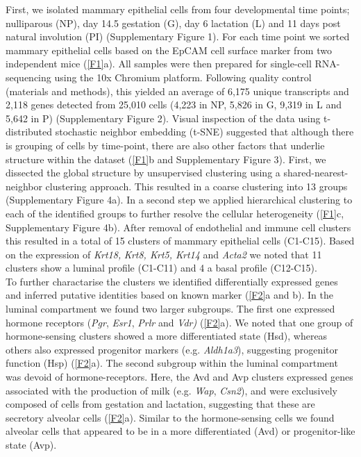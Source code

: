 \documentclass[titlepage, 12pt, oneside]{amsart}
\begin{document}
First, we isolated mammary epithelial cells from four developmental time points; nulliparous (NP), day 14.5 gestation (G), day 6 lactation (L) and 11 days post natural involution (PI) (Supplementary Figure 1).
For each time point we sorted mammary epithelial cells based on the EpCAM cell surface marker from two independent mice (\autoref{F1}a).
All samples were then prepared for single-cell RNA-sequencing using the 10x Chromium platform\autocite{Zheng2017}.
Following quality control (materials and methods), this yielded an average of 6,175 unique transcripts and 2,118 genes detected from 25,010 cells (4,223 in NP, 5,826 in G, 9,319 in L and 5,642 in P) (Supplementary Figure 2).
Visual inspection of the data using t-distributed stochastic neighbor embedding (t-SNE) suggested that although there is grouping of cells by time-point, there are also other factors that underlie structure within the dataset (\autoref{F1}b and Supplementary Figure 3).
First, we dissected the global structure by unsupervised clustering using a shared-nearest-neighbor clustering approach.
This resulted in a coarse clustering into 13 groups (Supplementary Figure 4a).
In a second step we applied hierarchical clustering to each of the identified groups to further resolve the cellular heterogeneity (\autoref{F1}c, Supplementary Figure 4b).
After removal of endothelial and immune cell clusters this resulted in a total of 15 clusters of mammary epithelial cells (C1-C15).
Based on the expression of \textit{Krt18,} \textit{Krt8, Krt5, Krt14} and \textit{Acta2} we noted that 11 clusters show a luminal profile (C1-C11) and 4 a basal profile (C12-C15).\\
To further charactarise the clusters we identified differentially expressed genes and inferred putative identities based on known marker (\autoref{F2}a and b).
In the luminal compartment we found two larger subgroups.
The first one expressed hormone receptors (\textit{Pgr}, \textit{Esr1}, \textit{Prlr} and \textit{Vdr)} (\autoref{F2}a).
We noted that one group of hormone-sensing clusters showed a more differentiated state (Hsd), whereas others also expressed progenitor markers (e.g. \textit{Aldh1a3}), suggesting progenitor function (Hsp) (\autoref{F2}a).
The second subgroup within the luminal compartment was devoid of hormone-receptors.
Here, the Avd and Avp clusters expressed genes associated with the production of milk (e.g. \textit{Wap}, \textit{Csn2}), and were exclusively composed of cells from gestation and lactation, suggesting that these are secretory alveolar cells (\autoref{F2}a).
Similar to the hormone-sensing cells we found alveolar cells that appeared to be in a more differentiated (Avd) or progenitor-like state (Avp).
\end{document}
